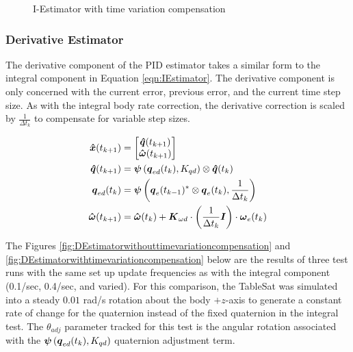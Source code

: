 \begin{figure}[H]
  \centerline{}
  \caption{I-Estimator with time variation compensation}
  \label{fig:IEstimatorwithtimevariationcompensation}
\end{figure}

\subsubsection{Derivative Estimator}
\label{subsubsec:DerivativeEstimator}

The derivative component of the PID estimator takes a similar form to the integral component in Equation \ref{eqn:IEstimator}.  The derivative component is only concerned with the current error, previous error, and the current time step size.  As with the integral body rate correction, the derivative correction is scaled by $\frac{1}{\Delta t_k}$ to compensate for variable step sizes.

\begin{subequations}
  \begin{align}
    \boldsymbol{\hat{x}}(t_{k+1}) &= \begin{bmatrix} \boldsymbol{\hat{q}}(t_{k+1}) \\ \boldsymbol{\hat{\omega}}(t_{k+1}) \end{bmatrix} \\
    \boldsymbol{\hat{q}}(t_{k+1}) &= \boldsymbol{\psi}\left(\boldsymbol{q}_{ed}(t_k), K_{qd}\right) \otimes \boldsymbol{\hat{q}}(t_{k}) \\
    \boldsymbol{q}_{ed}(t_k) &= \boldsymbol{\psi}\left(\boldsymbol{q}_e(t_{k-1})^* \otimes \boldsymbol{q}_e(t_{k}), \frac{1}{\Delta t_{k}}\right)\\
    \boldsymbol{\hat{\omega}}(t_{k+1}) &= \boldsymbol{\hat{\omega}}(t_{k}) + \boldsymbol{K}_{\omega d} \cdot \left(\frac{1}{\Delta t_k} \boldsymbol{I}\right) \cdot \boldsymbol{\omega}_e(t_{k})
  \end{align}
  \label{eqn:DEstimator}
\end{subequations}

The Figures \ref{fig:DEstimatorwithouttimevariationcompensation} and \ref{fig:DEstimatorwithtimevariationcompensation} below are the results of three test runs with the same set up update frequencies as with the integral component (0.1/sec, 0.4/sec, and varied).  For this comparison, the TableSat was simulated into a steady $0.01$ rad/s rotation about the body $+z$-axis to generate a constant rate of change for the quaternion instead of the fixed quaternion in the integral test.  The $\theta_{adj}$ parameter tracked for this test is the angular rotation associated with the $\boldsymbol{\psi}\left(\boldsymbol{q}_{ed}(t_k), K_{qd}\right)$ quaternion adjustment term.

